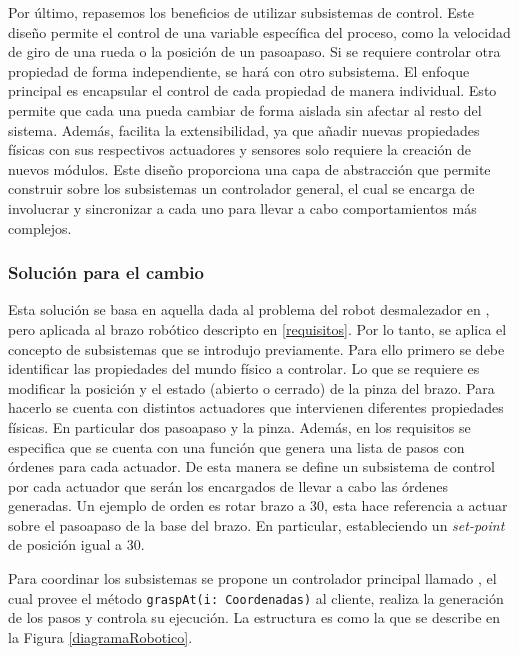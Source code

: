 Por último, repasemos los beneficios de utilizar subsistemas de control. Este diseño permite el control de una variable específica del proceso, como la velocidad de giro de una rueda o la posición de un \gls{pasoapaso}. Si se requiere controlar otra propiedad de forma independiente, se hará con otro subsistema. El enfoque principal es encapsular el control de cada propiedad de manera individual. Esto permite que cada una pueda cambiar de forma aislada sin afectar al resto del sistema. Además, facilita la extensibilidad, ya que añadir nuevas propiedades físicas con sus respectivos actuadores y sensores solo requiere la creación de nuevos módulos. Este diseño proporciona una capa de abstracción que permite construir sobre los subsistemas un controlador general, el cual se encarga de involucrar y sincronizar a cada uno para llevar a cabo comportamientos más complejos.



\subsubsection*{Solución para el cambio}

Esta solución se basa en aquella dada al problema del robot desmalezador en \citep{paperPomponio}, pero aplicada al brazo robótico descripto en \ref{requisitos}. Por lo tanto, se aplica el concepto de subsistemas que se introdujo previamente. Para ello primero se debe identificar las propiedades del mundo físico a controlar. Lo que se requiere es modificar la posición y el estado (abierto o cerrado) de la pinza del brazo. Para hacerlo se cuenta con distintos actuadores que intervienen diferentes propiedades físicas. En particular dos \gls{pasoapaso} y la pinza. Además, en los requisitos se especifica que se cuenta con una función que genera una lista de pasos con órdenes para cada actuador. De esta manera se define un subsistema de control por cada actuador que serán los encargados de llevar a cabo las órdenes generadas. Un ejemplo de orden es rotar brazo a 30\textdegree, esta hace referencia a actuar sobre el \gls{pasoapaso} de la base del brazo. En particular, estableciendo un \textit{set-point} de posición igual a 30\textdegree. 


Para coordinar los subsistemas se propone un controlador principal llamado \MainController, el cual provee el método \verb|graspAt(i: Coordenadas)| al cliente, realiza la generación de los pasos y controla su ejecución. La estructura es como la que se describe en la Figura \ref{diagramaRobotico}.


